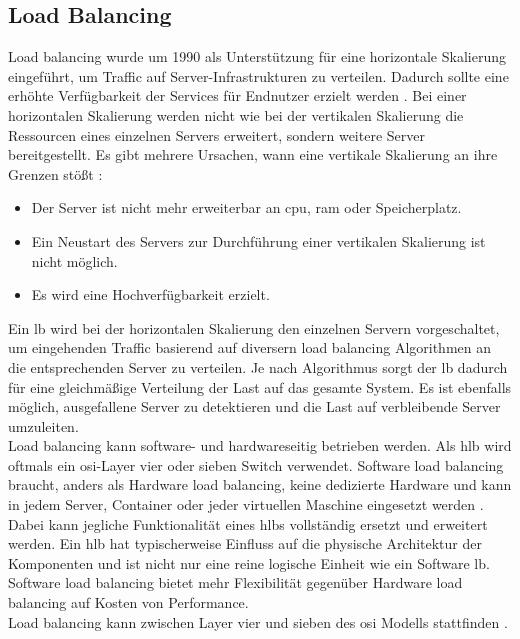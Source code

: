\subsection{Load Balancing} \label{s:load-balancing}
Load balancing wurde um 1990 als Unterstützung für eine horizontale Skalierung eingeführt, um Traffic auf Server-Infrastrukturen zu verteilen. Dadurch sollte eine erhöhte Verfügbarkeit der Services für Endnutzer erzielt werden \cite[S.~2]{bourkeServerLoadBalancing2001}.
Bei einer horizontalen Skalierung werden nicht wie bei der vertikalen Skalierung die Ressourcen eines einzelnen Servers erweitert, sondern weitere Server bereitgestellt. Es gibt mehrere Ursachen, wann eine vertikale Skalierung an ihre Grenzen stö{\ss}t \cite{bourkeServerLoadBalancing2001}:
\begin{itemize}
    \item Der Server ist nicht mehr erweiterbar an \acs{cpu}, \acs{ram} oder Speicherplatz.
    \item Ein Neustart des Servers zur Durchführung einer vertikalen Skalierung ist nicht möglich.
    \item Es wird eine Hochverfügbarkeit erzielt.
\end{itemize}
Ein \acl{lb} wird bei der horizontalen Skalierung den einzelnen Servern vorgeschaltet, um eingehenden Traffic basierend auf diversern load balancing Algorithmen an die entsprechenden Server zu verteilen.
Je nach Algorithmus sorgt der \ac{lb} dadurch für eine gleichmä{\ss}ige Verteilung der Last auf das gesamte System. Es ist ebenfalls möglich, ausgefallene Server zu detektieren und die Last auf verbleibende Server umzuleiten.
\cite[S.~8]{bourkeServerLoadBalancing2001}
\\
Load balancing kann software- und hardwareseitig betrieben werden. Als \ac{hlb} wird oftmals ein \acs{osi}-Layer vier oder sieben Switch verwendet.
Software load balancing braucht, anders als Hardware load balancing, keine dedizierte Hardware und kann in jedem Server, Container oder jeder virtuellen Maschine eingesetzt werden \cite{SoftwareLoadBalancing}.
Dabei kann jegliche Funktionalität eines \acp{hlb} vollständig ersetzt und erweitert werden.
Ein \ac{hlb} hat typischerweise Einfluss auf die physische Architektur der Komponenten und ist nicht nur eine reine logische Einheit wie ein Software \ac{lb}.
Software load balancing bietet mehr Flexibilität gegenüber Hardware load balancing auf Kosten von Performance.
\cite{WhatLoadBalancer}
\\
Load balancing kann zwischen Layer vier und sieben des \ac{osi} Modells stattfinden \cite{WhatLoadBalancer}.
